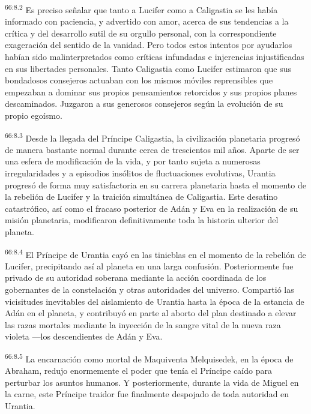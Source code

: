 \par
\textsuperscript{66:8.2} Es preciso señalar que tanto a Lucifer como a Caligastia se les había informado con paciencia, y advertido con amor, acerca de sus tendencias a la crítica y del desarrollo sutil de su orgullo personal, con la correspondiente exageración del sentido de la vanidad. Pero todos estos intentos por ayudarlos habían sido malinterpretados como críticas infundadas e injerencias injustificadas en sus libertades personales. Tanto Caligastia como Lucifer estimaron que sus bondadosos consejeros actuaban con los mismos móviles reprensibles que empezaban a dominar sus propios pensamientos retorcidos y sus propios planes descaminados. Juzgaron a sus generosos consejeros según la evolución de su propio egoísmo.

\par
\textsuperscript{66:8.3} Desde la llegada del Príncipe Caligastia, la civilización planetaria progresó de manera bastante normal durante cerca de trescientos mil años. Aparte de ser una esfera de modificación de la vida, y por tanto sujeta a numerosas irregularidades y a episodios insólitos de fluctuaciones evolutivas, Urantia progresó de forma muy satisfactoria en su carrera planetaria hasta el momento de la rebelión de Lucifer y la traición simultánea de Caligastia. Este desatino catastrófico, así como el fracaso posterior de Adán y Eva en la realización de su misión planetaria, modificaron definitivamente toda la historia ulterior del planeta.

\par
\textsuperscript{66:8.4} El Príncipe de Urantia cayó en las tinieblas en el momento de la rebelión de Lucifer, precipitando así al planeta en una larga confusión. Posteriormente fue privado de su autoridad soberana mediante la acción coordinada de los gobernantes de la constelación y otras autoridades del universo. Compartió las vicisitudes inevitables del aislamiento de Urantia hasta la época de la estancia de Adán en el planeta, y contribuyó en parte al aborto del plan destinado a elevar las razas mortales mediante la inyección de la sangre vital de la nueva raza violeta ---los descendientes de Adán y Eva.

\par
\textsuperscript{66:8.5} La encarnación como mortal de Maquiventa Melquisedek, en la época de Abraham, redujo enormemente el poder que tenía el Príncipe caído para perturbar los asuntos humanos. Y posteriormente, durante la vida de Miguel en la carne, este Príncipe traidor fue finalmente despojado de toda autoridad en Urantia.

